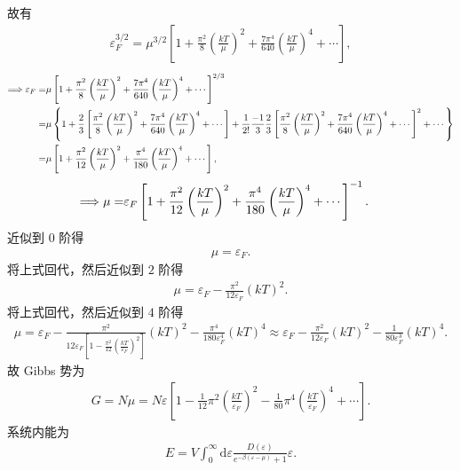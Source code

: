 \documentclass{assignment}
\begin{document}
\begin{pf}
    故有
    \begin{align}
        \varepsilon_F^{3/2}=\mu^{3/2}\left[1+\frac{\pi^2}{8}\left(\frac{kT}{\mu}\right)^2+\frac{7\pi^4}{640}\left(\frac{kT}{\mu}\right)^4+\cdots\right],
    \end{align}
    \begin{align}
        \notag\Longrightarrow\varepsilon_F=&\mu\left[1+\frac{\pi^2}{8}\left(\frac{kT}{\mu}\right)^2+\frac{7\pi^4}{640}\left(\frac{kT}{\mu}\right)^4+\cdots\right]^{2/3}\\
        \notag=&\mu\left\{1+\frac{2}{3}\left[\frac{\pi^2}{8}\left(\frac{kT}{\mu}\right)^2+\frac{7\pi^4}{640}\left(\frac{kT}{\mu}\right)^4+\cdots\right]+\frac{1}{2!}\frac{-1}{3}\frac{2}{3}\left[\frac{\pi^2}{8}\left(\frac{kT}{\mu}\right)^2+\frac{7\pi^4}{640}\left(\frac{kT}{\mu}\right)^4+\cdots\right]^2+\cdots\right\}\\
        =&\mu\left[1+\frac{\pi^2}{12}\left(\frac{kT}{\mu}\right)^2+\frac{\pi^4}{180}\left(\frac{kT}{\mu}\right)^4+\cdots\right],
    \end{align}
    \begin{align}
        \notag\Longrightarrow\mu=&\varepsilon_F\left[1+\frac{\pi^2}{12}\left(\frac{kT}{\mu}\right)^2+\frac{\pi^4}{180}\left(\frac{kT}{\mu}\right)^4+\cdots\right]^{-1}.
    \end{align}
    近似到 $0$ 阶得
    \begin{align}
        \mu=\varepsilon_F.
    \end{align}
    将上式回代，然后近似到 $2$ 阶得
    \begin{align}
        \mu=\varepsilon_F-\frac{\pi^2}{12\varepsilon_F}(kT)^2.
    \end{align}
    将上式回代，然后近似到 $4$ 阶得
    \begin{align}
        \label{2-mu}
        \mu=\varepsilon_F-\frac{\pi^2}{12\varepsilon_F\left[1-\frac{\pi^2}{12}\left(\frac{kT}{\varepsilon_F}\right)^2\right]}(kT)^2-\frac{\pi^4}{180\varepsilon_F^4}(kT)^4\approx\varepsilon_F-\frac{\pi^2}{12\varepsilon_F}(kT)^2-\frac{1}{80\varepsilon_F^3}(kT)^4.
    \end{align}
    故 Gibbs 势为
    \begin{align}
        G=N\mu=N\varepsilon\left[1-\frac{1}{12}\pi^2\left(\frac{kT}{\varepsilon_F}\right)^2-\frac{1}{80}\pi^4\left(\frac{kT}{\varepsilon_F}\right)^4+\cdots\right].
    \end{align}
    系统内能为
    \begin{align}
        E=V\int_0^{\infty}\mathrm{d}\varepsilon\frac{D(\varepsilon)}{e^{-\beta(\varepsilon-\mu)}+1}\varepsilon.

\end{align}
\end{pf}
\end{document}
